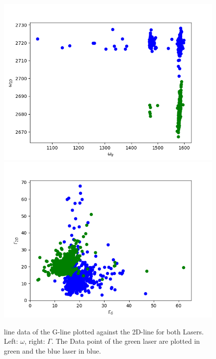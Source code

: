 \documentclass[12pt,a4paper]{article}
\begin{document}
\begin{figure}
\centering
\includegraphics[scale=0.5]{Bilder/Laser/omega.png}
\includegraphics[scale=0.5]{Bilder/Laser/gamma.png}
\caption{line data of the G-line plotted against the 2D-line for both Lasers. Left: $\omega$, right: $\Gamma$. The Data point of the green laser are plotted in green and the blue laser in blue.}
\label{fig:Laser_omega}
\end{figure}
\end{document}
